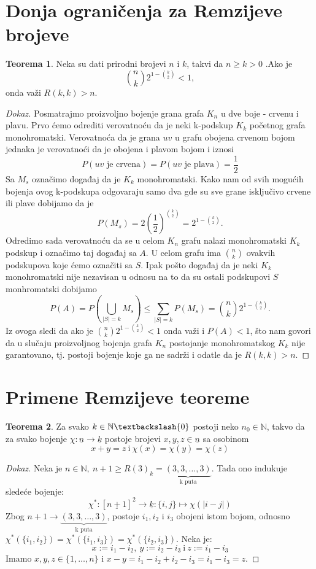 \documentclass{article}
\theoremstyle{definition}
\newtheorem{teorema}{Teorema}[section]
\newcommand{\dokaz}[1]{\begin{proof}[Dokaz]#1\end{proof}}
\begin{document}
\section{Donja ograničenja za Remzijeve brojeve}
\begin{teorema}\label{dot1}
Neka su dati prirodni brojevi $n$ i $k$, takvi da $n \geq{k} > 0$ .Ako je $$\binom{n}{k}2^{1 - \binom{k}{2}} < 1 ,$$  onda važi $R(k,k) > n$.
\dokaz{
	Posmatrajmo proizvoljno bojenje grana grafa $K_n$ u dve boje - crvenu i plavu. Prvo ćemo odrediti verovatnoću da je neki k-podskup $K_k$ početnog grafa monohromatski. 
	\newline
	Verovatnoća da je grana $uv$ u grafu obojena crvenom bojom jednaka je verovatnoći da je obojena i plavom bojom i iznosi 
	$$P(uv \text{ je crvena}) = P(uv \text{ je plava}) = \frac{1}{2}$$
	Sa $M_s$ označimo događaj da je $K_k$ monohromatski. Kako nam od svih mogućih bojenja ovog k-podskupa odgovaraju samo dva gde su sve grane isključivo crvene ili plave dobijamo
	da je
	$$P(M_s) = 2\left(\frac{1}{2}\right)^{\binom{k}{2}} = 2 ^ {1 - \binom{k}{2}}.$$
	Odredimo sada verovatnoću da se u celom $K_n$ grafu nalazi monohromatski $K_k$ podskup i označimo taj događaj sa $A$. U celom grafu ima $\binom{n}{k}$ ovakvih podskupova koje 			ćemo označiti sa $S$. Ipak pošto događaj da je neki $K_k$ monohromatski nije nezavisan u odnosu na to da su ostali podskupovi $S$ monhromatski dobijamo 
	$$P(A) = P(\bigcup_{|S|=k}M_s) \leq{\sum_{|S|=k}P(M_s)} = \binom{n}{k} 2 ^ {1 - \binom{k}{2}}.$$
	Iz ovoga sledi da ako je $\binom{n}{k} 2 ^ {1 - \binom{k}{2}} < 1$ onda važi i $P(A) < 1$, što nam govori da u slučaju proizvoljnog bojenja grafa $K_n$ postojanje monohromatskog 
	$K_k$ nije garantovano, tj. postoji bojenje koje ga ne sadrži i odatle da je $R(k,k) > n$.
}
\end{teorema}
	
	\section{Primene Remzijeve teoreme}
	\begin{teorema}\label{sur}
		Za svako $k \in \mathbb{N}\textbackslash \{0\}$  postoji neko $n_{0} \in \mathbb{N}$, takvo da za svako bojenje $\chi:\underline{n} \rightarrow \underline{k}$ postoje brojevi $x, y, z \in \underline{n}$ sa osobinom 
		\[
		x + y = z \: \mathrm{i} \: \chi(x)= \chi(y)=\chi(z)
		\]
	\end{teorema}
	\dokaz{
		Neka je $n \in \mathbb{N},\: n+1 \geq R(3)_k=\underbrace{(3,3,\ldots,3)}_\text{k puta}$. Tada ono indukuje sledeće bojenje:
		\[
			\chi^*:[\underline{n+1}]^2\rightarrow \underline{k}:\{i,j\}\mapsto \chi(|i-j|)
		\]
		Zbog $n+1 \rightarrow \underbrace{(3,3,\ldots,3)}_\text{k puta}$, postoje $i_1, i_2$ i $i_3$ obojeni istom bojom, odnosno $\chi^*(\{i_1,i_2\})=\chi^*(\{i_1,i_3\})=\chi^*(\{i_2,i_3\})$. Neka je:
		\[
			x:=i_1-i_2,\:y:=i_2-i_3\:\mathrm{i}\:z:=i_1-i_3
		\]
		Imamo $x,y,z\in \{1,\ldots,n\}$ i $x-y=i_1-i_2+i_2-i_3=i_1-i_3=z$.
	}
	
\end{document}
